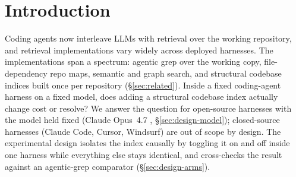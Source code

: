 %
%

\section{Introduction}
\label{sec:intro}

Coding agents now interleave LLMs with retrieval over the working repository, and retrieval
implementations vary widely across deployed harnesses. The implementations span a
spectrum: agentic grep over the working copy, file-dependency repo maps, semantic and
graph search, and structural codebase indices built once per repository
(\S\ref{sec:related}). Inside a fixed coding-agent harness on a fixed model, does adding a
structural codebase index actually change cost or resolve? We answer the question for
open-source harnesses with the model held fixed (Claude Opus~4.7
\citep{claudeopus47}, \S\ref{sec:design-model}); closed-source harnesses (Claude Code, Cursor, Windsurf) are out
of scope by design. The experimental design isolates the index causally by toggling it on
and off inside one harness while everything else stays identical, and cross-checks the
result against an agentic-grep comparator (\S\ref{sec:design-arms}).

